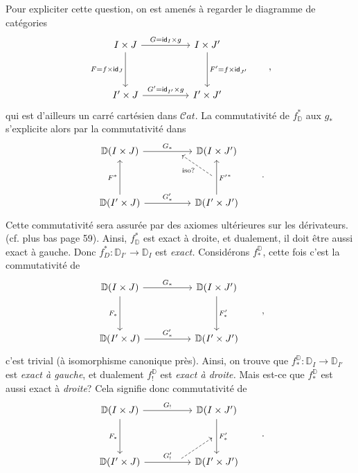 \documentclass[11pt]{article}
\newcommand{\printedpage}[1]{\marginpar{\footnotesize p.~#1}}
\newcommand{\msp}[1]{\marginpar{\footnotesize [#1]}}
\newcommand{\D}{\mathbb{D}}
\newcommand{\id}{\mathsf{id}}
\newcommand{\Cat}{\mathcal{C}at}
\begin{document}
\printedpage{16}

\msp{page 22: blank}

\msp{page 23}

Pour expliciter cette question, on est amenés à regarder le diagramme de catégories
\[
\begin{tikzcd}[column sep=huge, row sep=huge]
I \times J \arrow[r, "G = \id_I \times g"] \arrow[d, "F = f \times \id_J"'] & I \times J' \arrow[d, "F' = f \times \id_{J'}"] \\
I' \times J \arrow[r, "G' = \id_{I'} \times g"] & I' \times J'
\end{tikzcd}
\qquad ,
\]
qui est d'ailleurs un carré cartésien dans $\Cat$. La commutativité de $f^*_{\D}$ aux $g_*$ s'explicite alors par la commutativité dans
\[
\begin{tikzcd}[column sep=huge, row sep=huge]
\D(I \times J) \arrow[r, "G_*", ""{name=T, below, near end}] & \D(I \times J') \\
\D(I' \times J) \arrow[u, "F^*"] \arrow[r, "G'_*"] & \D(I' \times J') \arrow[u, "{F'}^*"', ""{name=R, left}]
\arrow[dashed, from=R, to=T, "\text{iso?}"]
\end{tikzcd}
\qquad .
\]
Cette commutativité sera assurée par des axiomes ultérieures sur les dérivateurs. (cf. plus %
bas page 59). Ainsi, $f^*_{\D}$ est exact à droite, et dualement, il doit être aussi exact à gauche. Donc $f^*_D : \D_{I'} \to \D_I$ est \textit{exact.} Considérons $f^{\D}_*$, %
cette fois c'est la commutativité de
\[
\begin{tikzcd}[column sep=huge, row sep=huge]
\D(I \times J) \arrow[r, "G_*"] \arrow[d, "F_*"'] & \D(I \times J') \arrow[d, "F'_*"] \\
\D(I' \times J) \arrow[r, "G'_*"] & \D(I' \times J')
\end{tikzcd}
\qquad ,
\]
c'est trivial (à isomorphisme canonique près). Ainsi, on
\msp{page 24}
trouve que $f^{\D}_* : \D_I \to \D_{I'}$ est \textit{exact à gauche}, et dualement $f^{\D}_!$ est \textit{exact à droite.} Mais est-ce que $f^{\D}_*$ est aussi exact à \textit{droite}? Cela signifie donc commutativité de
\[
\begin{tikzcd}[column sep=huge, row sep=huge]
\D(I \times J) \arrow[r, "G_!"] \arrow[d, "F_*"'] & \D(I \times J') \arrow[d, "F'_*", ""{name=R2, left}] \\
\D(I' \times J) \arrow[r, "G'_!", ""{name=B, above, near end}] & \D(I' \times J')
\arrow[dashed, from=B, to=R2]
\end{tikzcd}
\qquad .
\]
\end{document}
